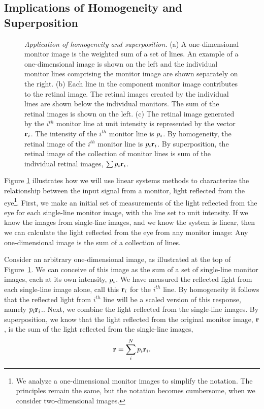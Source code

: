 \subsection*{Implications of Homogeneity and Superposition}
\begin{figure}
\centerline{
}
\caption[Homogeneity and Superposition]{
{\em Application of homogeneity and superposition.}
(a)
A one-dimensional monitor image is the weighted sum of a set of lines.
An example of a one-dimensional image is shown on the left
and the individual monitor lines comprising
the monitor image are shown separately on the right.
(b) Each line in the component monitor image 
contributes to the retinal image.
The retinal images created by the individual lines
are shown below the individual monitors.
The sum of the retinal images is shown on the left.
(c) The retinal image generated by
the $i^{th}$ monitor line at unit intensity is 
represented by the vector $\mbox {$\bf r$}_{i}$.
The intensity of the $i^{th}$
monitor line is $\mbox{$p_{i}$}$.
By homogeneity, the retinal image of the $i^{th}$ monitor line
is $\mbox{$p_{i}$} \mbox {$\bf r$}_{i}$.
By superposition, the retinal image of the collection
of monitor lines is sum 
of the individual retinal images, $\sum \mbox{$p_{i}$} \mbox {$\bf r$}_{i}$.
}
\label{f1:app.hom.sup}
\end{figure}
Figure \ref{f1:app.hom.sup} illustrates how we will use
linear systems methods to characterize
the relationship between the input signal from a monitor,
light reflected from the eye\footnote{We analyze a one-dimensional monitor
images to simplify the notation. The principles remain the same,
but the notation becomes cumbersome, when we consider two-dimensional images.}.
First, we make an initial set of measurements
of the light reflected from the eye for each single-line monitor
image, with the line set to unit intensity.
If we know the images from single-line images,
and we know the system is linear,
then we can calculate the light reflected from the eye
from any monitor image:
Any one-dimensional image is the sum of a collection of lines.

Consider an arbitrary one-dimensional image, as illustrated at the
top of Figure~\ref{f1:app.hom.sup}.
We can conceive of this image as the sum of a set of single-line monitor
images, each at its own intensity, $\mbox{$p_{i}$}$.
We have measured the reflected light from each single-line image
alone, call this $\mbox {$\bf r$}_i$ for the $i^{th}$ line.
By homogeneity it follows that the reflected light from $i^{th}$ line
will be a scaled version of this response, namely $\mbox{$p_{i}$} \mbox {$\bf r$}_i$..
Next, we combine the light reflected from the single-line images.
By superposition, we know that the light reflected from the
original monitor image, $\mbox {$\bf r$}$, is the sum of the light reflected from
the single-line images,
\begin{equation}
\label{e1:MatrixMultiplication0}
\mbox {$\bf r$} = \sum_i^{N} \mbox{$p_{i}$} \mbox {$\bf r$}_i .
\end{equation}

